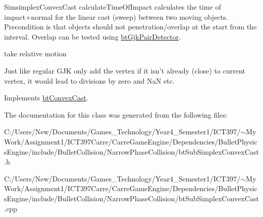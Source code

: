 SimsimplexConvexCast calculateTimeOfImpact calculates the time of impact+normal for the linear cast (sweep) between two moving objects. Precondition is that objects should not penetration/overlap at the start from the interval. Overlap can be tested using \hyperlink{classbt_gjk_pair_detector}{btGjkPairDetector}. 

take relative motion

Just like regular GJK only add the vertex if it isn't already (close) to current vertex, it would lead to divisions by zero and NaN etc. 

Implements \hyperlink{classbt_convex_cast_baf0f25a8cccfcafdaabada83c8d2bfb}{btConvexCast}.

The documentation for this class was generated from the following files:\begin{CompactItemize}
\item 
C:/Users/New/Documents/Games\_\-Technology/Year4\_\-Semester1/ICT397/$\sim$My Work/Assignment1/ICT397Carre/CarreGameEngine/Dependencies/BulletPhysicsEngine/include/BulletCollision/NarrowPhaseCollision/btSubSimplexConvexCast.h\item 
C:/Users/New/Documents/Games\_\-Technology/Year4\_\-Semester1/ICT397/$\sim$My Work/Assignment1/ICT397Carre/CarreGameEngine/Dependencies/BulletPhysicsEngine/include/BulletCollision/NarrowPhaseCollision/btSubSimplexConvexCast.cpp\end{CompactItemize}
